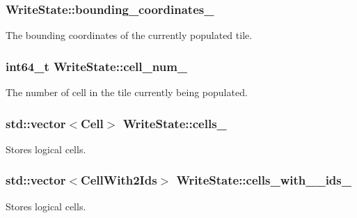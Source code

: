 \subsubsection[{bounding\+\_\+coordinates\+\_\+}]{ Write\+State\+::bounding\+\_\+coordinates\+\_\+\hspace{0.3cm}{\ttfamily [private]}}\label{structWriteState_a50b41a53268ae74bec6e24695624f9d0}
The bounding coordinates of the currently populated tile. \hypertarget{structWriteState_a059d757cb8fbc5bb7bfff6e1f5ea7f79}{}
\subsubsection[{cell\+\_\+num\+\_\+}]{\setlength{\rightskip}{0pt plus 5cm}int64\+\_\+t Write\+State\+::cell\+\_\+num\+\_\+\hspace{0.3cm}{\ttfamily [private]}}\label{structWriteState_a059d757cb8fbc5bb7bfff6e1f5ea7f79}
The number of cell in the tile currently being populated. \hypertarget{structWriteState_a90d90b4abfd9e35f1726842617122558}{}
\subsubsection[{cells\+\_\+}]{\setlength{\rightskip}{0pt plus 5cm}std\+::vector$<${\bf Cell}$>$ Write\+State\+::cells\+\_\+\hspace{0.3cm}{\ttfamily [private]}}\label{structWriteState_a90d90b4abfd9e35f1726842617122558}
Stores logical cells. \hypertarget{structWriteState_a1b14e06c30ce9617b2f1a16263b1a134}{}
\subsubsection[{cells\+\_\+with\+\_\+2\+\_\+ids\+\_\+}]{\setlength{\rightskip}{0pt plus 5cm}std\+::vector$<${\bf Cell\+With2\+Ids}$>$ Write\+State\+::cells\+\_\+with\+\_\+\_\+ids\+\_\+\hspace{0.3cm}{\ttfamily [private]}}\label{structWriteState_a1b14e06c30ce9617b2f1a16263b1a134}
Stores logical cells. \hypertarget{structWriteState_a296e22c27c0c1965771670d3bdd2dfd5}{}
